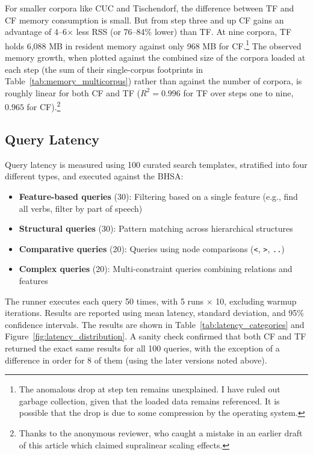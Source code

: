 \documentclass[11pt,a4paper]{article}
\begin{document}
For smaller corpora like CUC and Tischendorf, the difference between TF and CF memory consumption is small.
But from step three and up CF gains an advantage of 4--6$\times$ less RSS (or 76--84\% lower) than TF.
At nine corpora, TF holds 6,088 MB in resident memory against only 968 MB for CF.\footnote{
    The anomalous drop at step ten remains unexplained. I have ruled out garbage collection, given that
    the loaded data remains referenced. It is possible that the drop is due to some compression by the
    operating system.
}
The observed memory growth, when plotted against the combined size of the corpora loaded at each step
(the sum of their single-corpus footprints in Table~\ref{tab:memory_multicorpus}) rather than against the number of corpora,
is roughly linear for both CF and TF ($R^2 = 0.996$ for TF over steps one to nine, $0.965$ for CF).\footnote{
    Thanks to the anonymous reviewer, who caught a mistake in an earlier draft of this article which
    claimed supralinear scaling effects.
}

\subsection{Query Latency}
\label{sec:query_latency}

Query latency is measured using 100 curated search templates, stratified into four
different types, and executed against the BHSA:

\begin{itemize}
    \item \textbf{Feature-based queries} (30): Filtering based on a single feature (e.g., find all verbs, filter by part of speech)
    \item \textbf{Structural queries} (30): Pattern matching across hierarchical structures
    \item \textbf{Comparative queries} (20): Queries using node comparisons (\texttt{<}, \texttt{>}, \texttt{..})
    \item \textbf{Complex queries} (20): Multi-constraint queries combining relations and features
\end{itemize}

The runner executes each query 50 times, with 5 runs $\times$ 10, excluding warmup iterations.
Results are reported using mean latency, standard deviation, and 95\% confidence intervals. The results
are shown in Table~\ref{tab:latency_categories} and Figure~\ref{fig:latency_distribution}.
A sanity check confirmed that both CF and TF returned the exact same results for all 100 queries,
with the exception of a difference in order for 8 of them (using the later versions noted above).
\end{document}

